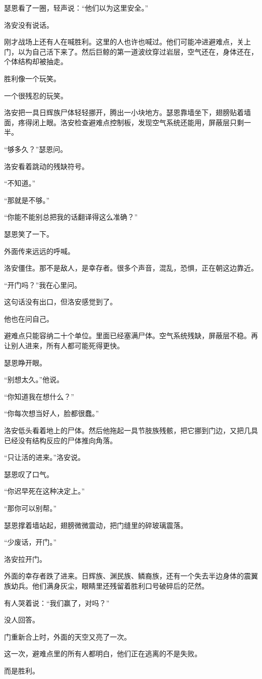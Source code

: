 瑟恩看了一圈，轻声说：“他们以为这里安全。”

洛安没有说话。

刚才战场上还有人在喊胜利。这里的人也许也喊过。他们可能冲进避难点，关上门，以为自己活下来了。然后巨鲸的第一道波纹穿过岩层，空气还在，身体还在，个体结构却被抽走。

胜利像一个玩笑。

一个很残忍的玩笑。

洛安把一具日辉族尸体轻轻挪开，腾出一小块地方。瑟恩靠墙坐下，翅膀贴着墙面，疼得闭上眼。洛安检查避难点控制板，发现空气系统还能用，屏蔽层只剩一半。

“够多久？”瑟恩问。

洛安看着跳动的残缺符号。

“不知道。”

“那就是不够。”

“你能不能别总把我的话翻译得这么准确？”

瑟恩笑了一下。

外面传来远远的呼喊。

洛安僵住。那不是敌人，是幸存者。很多个声音，混乱，恐惧，正在朝这边靠近。

“开门吗？”我在心里问。

这句话没有出口，但洛安感觉到了。

他也在问自己。

避难点只能容纳二十个单位。里面已经塞满尸体。空气系统残缺，屏蔽层不稳。再让别人进来，所有人都可能死得更快。

瑟恩睁开眼。

“别想太久。”他说。

“你知道我在想什么？”

“你每次想当好人，脸都很蠢。”

洛安低头看着地上的尸体。然后他拖起一具节肢族残骸，把它挪到门边，又把几具已经没有结构反应的尸体推向角落。

“只让活的进来。”洛安说。

瑟恩叹了口气。

“你迟早死在这种决定上。”

“那你可以别帮。”

瑟恩撑着墙站起，翅膀微微震动，把门缝里的碎玻璃震落。

“少废话，开门。”

洛安拉开门。

外面的幸存者跌了进来。日辉族、渊民族、鳞裔族，还有一个失去半边身体的震翼族幼兵。他们满身灰尘，眼睛里还残留着胜利口号破碎后的茫然。

有人哭着说：“我们赢了，对吗？”

没人回答。

门重新合上时，外面的天空又亮了一次。

这一次，避难点里的所有人都明白，他们正在逃离的不是失败。

而是胜利。
